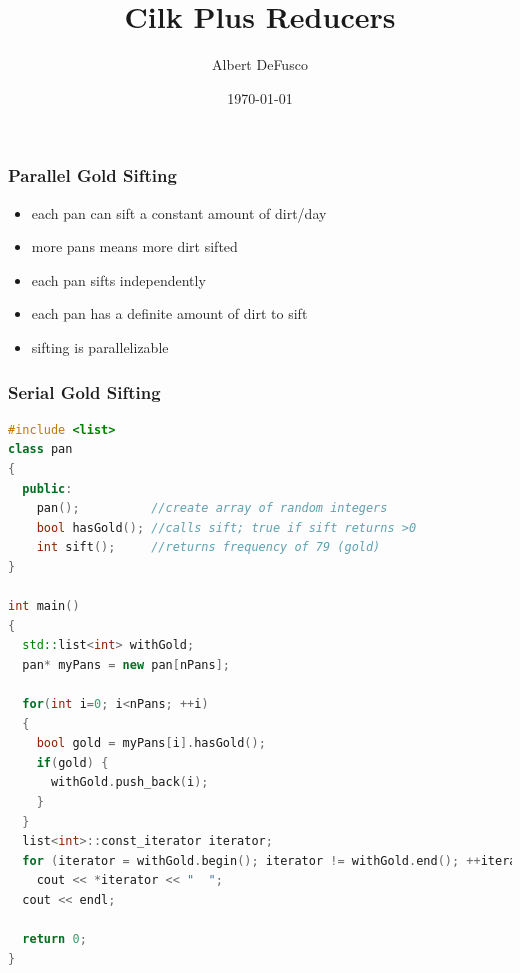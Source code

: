 \documentclass[fleqn,xcolor=table,10pt,final]{beamer}
\begin{document}
\title{Cilk Plus Reducers}
\author{Albert DeFusco}
\date{\today}
\frame{\titlepage}


\begin{frame}
  \frametitle{Parallel Gold Sifting}
  \begin{itemize}
    \item each pan can sift a constant amount of dirt/day
    \item more pans means more dirt sifted
  \end{itemize}
  \vskip 0.2cm
  \begin{itemize}
    \item each pan sifts independently
    \item each pan has a definite amount of dirt to sift
  \end{itemize}
  \vskip 0.2cm
  \begin{itemize}
    \item sifting is parallelizable
  \end{itemize}
\end{frame}

\begin{frame}[fragile]
  \frametitle{Serial Gold Sifting}
  \begin{lstlisting}[language=C++,basicstyle=\scriptsize]
#include <list>
class pan
{
  public:
    pan();          //create array of random integers
    bool hasGold(); //calls sift; true if sift returns >0
    int sift();     //returns frequency of 79 (gold)
}

int main()
{
  std::list<int> withGold;
  pan* myPans = new pan[nPans];

  for(int i=0; i<nPans; ++i)
  {
    bool gold = myPans[i].hasGold();
    if(gold) {
      withGold.push_back(i);
    }
  }
  list<int>::const_iterator iterator;
  for (iterator = withGold.begin(); iterator != withGold.end(); ++iterator)
    cout << *iterator << "  ";
  cout << endl;

  return 0;
}
  \end{lstlisting}
\end{frame}
\end{document}
